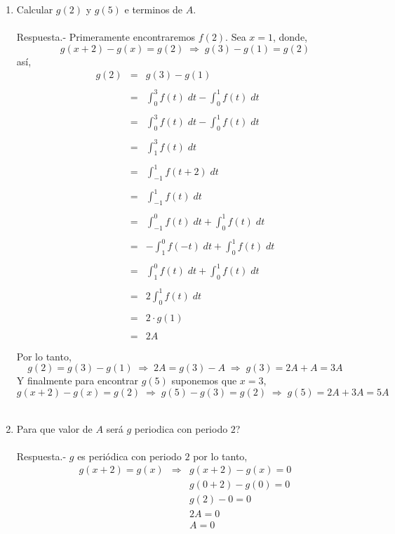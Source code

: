 \begin{enumerate}[\bfseries  1.]
\begin{enumerate}[\bfseries (a)]
	    \item Calcular $g(2)$ y $g(5)$ e terminos de $A$.\\\\
		Respuesta.-\; Primeramente encontraremos $f(2)$. Sea $x=1$, donde,
		$$g(x+2)-g(x)=g(2)\; \Longrightarrow \; g(3)-g(1)=g(2)$$
		así,
		$$\begin{array}{rcl}
		    g(2)&=&g(3)-g(1)\\\\\
			&=&\displaystyle\int_0^3 f(t)\; dt - \int_0^1 f(t)\; dt\\\\
			&=&\displaystyle\int_0^3 f(t)\;dt - \int_0^1 f(t)\; dt\\\\
			&=&\displaystyle\int_1^3 f(t)\; dt\\\\
			&=&\displaystyle\int_{-1}^1 f(t+2)\; dt\\\\
			&=&\displaystyle\int_{-1}^1 f(t)\; dt\\\\
			&=&\displaystyle\int_{-1}^0 f(t)\; dt + \int_0^1 f(t)\; dt\\\\
			&=&-\displaystyle\int_1^0 f(-t)\; dt + \int_0^1 f(t)\; dt\\\\
			&=&\displaystyle\int_{1}^0 f(t)\; dt + \int_0^1 f(t)\; dt \\\\
			&=&2\displaystyle\int_{0}^1 f(t)\; dt \\\\
			&=&2\cdot g(1)\\\\
			&=&2A\\\\
		\end{array}$$
		Por lo tanto, 
		$$g(2)=g(3)-g(1)\; \Longrightarrow \; 2A=g(3)-A \; \Longrightarrow \; g(3)=2A+A=3A$$
		Y finalmente para encontrar $g(5)$ suponemos que $x=3$,
		$$g(x+2)-g(x)=g(2)\; \Longrightarrow \; g(5)-g(3)=g(2)\; \Longrightarrow \; g(5) = 2A + 3A = 5A$$\\

	    \item Para que valor de $A$ será $g$ periodica con periodo $2$?\\\\
		Respuesta.-\; $g$ es periódica con periodo $2$ por lo tanto,
		$$\begin{array}{rcr}
		    g(x+2)=g(x)&\Longrightarrow&g(x+2)-g(x)=0\\
			       &&g(0+2)-g(0)=0\\
			       &&g(2)-0=0\\
			       &&2A=0\\
			       &&A=0\\\\
		\end{array}$$


\end{enumerate}
\end{enumerate}
